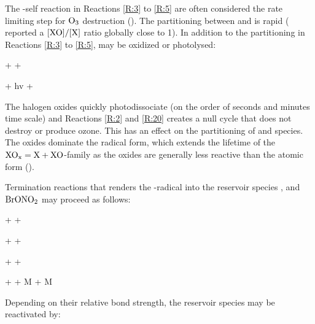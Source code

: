 The -self reaction in Reactions \ref{R:3} to \ref{R:5} are often considered the rate limiting step for $\mathrm{O_3}$ destruction (\cite{JPL}). The partitioning between  and  is rapid (\cite{Schmidt} reported a $[\mathrm{XO}]/[\mathrm{X}]$ ratio globally close to 1). In addition to the partitioning in Reactions \ref{R:3} to \ref{R:5},  may be oxidized or photolysed:  

\begin{reaction}
     +  \rightarrow {} + 
    \label{R:15}
\end{reaction}

\begin{reaction}
     + hv \rightarrow {} + 
    \label{R:20}
\end{reaction}

The halogen oxides quickly photodissociate (on the order of seconds and minutes time scale) and Reactions \ref{R:2} and \ref{R:20} creates a null cycle that does not destroy or produce ozone. This has an effect on the partitioning of  and  species. The oxides dominate the radical form, which extends the lifetime of the $\mathrm{XO_x} = \mathrm{X} + \mathrm{XO}$-family as the oxides are generally less reactive than the atomic form (\cite{Simpson2015}). 

\medskip

Termination reactions that renders the -radical into the reservoir species ,  and $\mathrm{BrONO_2}$ may proceed as follows: 

\begin{reaction}
     +  \rightarrow {} + 
    \label{R:6} 
\end{reaction}

\begin{reaction}
     +  \rightarrow {} + 
    \label{R:17}
\end{reaction}


\begin{reaction}
     +  \rightarrow {} + 
    \label{R:16}
\end{reaction}

\begin{reaction}
     +  + M \rightarrow {} + M
    \label{R:9}
\end{reaction}

Depending on their relative bond strength, the reservoir species may be reactivated by: 


